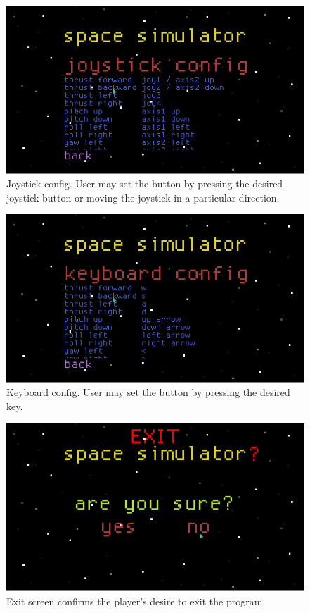\begin{figure}[H]
  \centering
  \includegraphics[scale=0.5]{../images/07-joystick_config.png}
  \caption{Joystick config.  User may set the button by pressing the desired joystick button or moving the joystick in a particular direction.}
\end{figure}

\begin{figure}[H]
  \centering
  \includegraphics[scale=0.5]{../images/08-keyboard_config.png}
  \caption{Keyboard config.  User may set the button by pressing the desired key.}
\end{figure}

\begin{figure}[H]
  \centering
  \includegraphics[scale=0.5]{../images/09-exit.png}
  \caption{Exit screen confirms the player's desire to exit the program.}
\end{figure}

